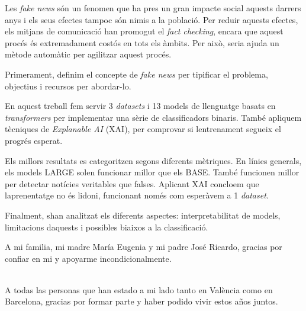 \documentclass[twoside,spanish,a4paper,12pt]{tfg}
\begin{document}
\begin{resum}
    Les \textit{fake news} són un fenomen que ha pres un gran impacte social aquests darrers anys i els seus efectes tampoc són nimis a la població. Per reduir aquests efectes, els mitjans de comunicació han promogut el \textit{fact checking}, encara que aquest procés és extremadament costós en tots els àmbits. Per això, seria ajuda un mètode automàtic per agilitzar aquest procés.

    Primerament, definim el concepte de \textit{fake news} per tipificar el problema, objectius i recursos per abordar-lo.
    
    En aquest treball fem servir 3 \textit{datasets} i 13 models de llenguatge basats en \textit{transformers} per implementar una sèrie de classificadors binaris. També apliquem tècniques de \textit{Explanable AI} (XAI), per comprovar si l\textquotesingle entrenament segueix el progrés esperat.
    
    Els millors resultats es categoritzen segons diferents mètriques. En línies generals, els models LARGE solen funcionar millor que els BASE. També funcionen millor per detectar notícies veritables que falses. Aplicant XAI concloem que l\textquotesingle aprenentatge no és l\textquotesingle idoni, funcionant només com esperàvem a 1 \textit{dataset}.
    
    Finalment, s\textquotesingle han analitzat els diferents aspectes: interpretabilitat de models, limitacions d\textquotesingle aquests i possibles biaixos a la classificació.
\end{resum}
\cleardoublepage


\begin{agradecimientos}
  A mi familia, mi madre María Eugenia y mi padre José Ricardo, gracias por confiar en mi y apoyarme incondicionalmente.

\\

  A todas las personas que han estado a mi lado tanto en València como en Barcelona, gracias por formar parte y haber podido vivir estos años juntos.
\end{agradecimientos}
\cleardoublepage

\tableofcontents

\pagestyle{tfg}
\justify


\end{document}
